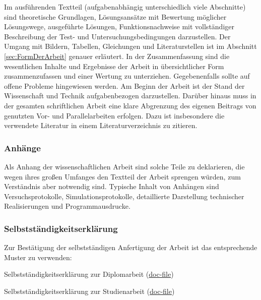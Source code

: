 Im ausführenden Textteil (aufgabenabhängig unterschiedlich viele Abschnitte) sind theoretische Grundlagen, Lösungsansätze mit Bewertung möglicher Lösungswege, ausgeführte Lösungen, Funktionsnachweise mit vollständiger Beschreibung der Test- und Untersuchungsbedingungen darzustellen.
Der Umgang mit Bildern, Tabellen, Gleichungen und Literaturstellen ist im Abschnitt \ref{sec:FormDerArbeit} genauer erläutert.
In der Zusammenfassung sind die wesentlichen Inhalte und Ergebnisse der Arbeit in übersichtlicher Form zusammenzufassen und einer Wertung zu unterziehen. Gegebenenfalls sollte auf offene Probleme hingewiesen werden.
Am Beginn der Arbeit ist der Stand der Wissenschaft und Technik aufgabenbezogen darzustellen. Darüber hinaus muss in der gesamten schriftlichen Arbeit eine klare Abgrenzung des eigenen Beitrags von genutzten Vor- und Parallelarbeiten erfolgen. Dazu ist insbesondere die verwendete Literatur in einem Literaturverzeichnis zu zitieren.


\subsubsection{Anhänge}
\label{sec:Anhänge}

Als Anhang der wissenschaftlichen Arbeit sind solche Teile zu deklarieren, die wegen ihres großen Umfanges den Textteil der Arbeit sprengen würden, zum Verständnis aber notwendig sind. Typische Inhalt von Anhängen sind Versuchsprotokolle, Simulationsprotokolle, detaillierte Darstellung technischer Realisierungen und Programmausdrucke.

\subsubsection{Selbstständigkeitserklärung}
\label{sec:Selbstständigkeitserklärung}

Zur Bestätigung der selbstständigen Anfertigung der Arbeit ist das entsprechende Muster zu verwenden:
\begin{compactitem}
  \item Selbstständigkeitserklärung zur Diplomarbeit (\href{http://www.et.tu-dresden.de/ifa/fileadmin/user_upload/www_files/richtlinien_sa_da/DA_Selbststaendigkeit.doc}{doc-file})
  \item Selbstständigkeitserklärung zur Studienarbeit (\href{http://www.et.tu-dresden.de/ifa/fileadmin/user_upload/www_files/richtlinien_sa_da/SA_Selbststaendigkeit.doc}{doc-file})
\end{compactitem}


